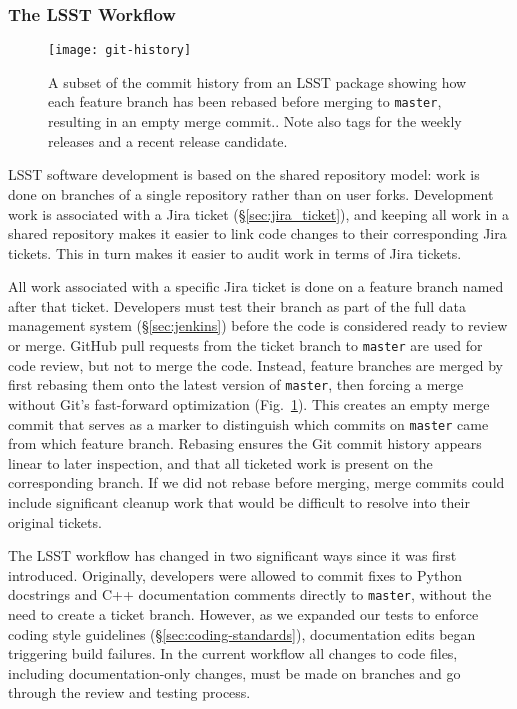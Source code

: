 \subsubsection{The LSST Workflow}\label{sec:dev_workflow}

\begin{figure}[t]
\begin{center}
  \texttt{[image: git-history]}
\end{center}
\caption{A subset of the commit history from an  LSST package showing how each feature branch has been rebased before merging to \texttt{master}, resulting in an empty merge commit..
Note also  tags for the weekly releases and a recent release candidate.
\label{fig:commitlog}
}
\end{figure}

LSST software development is based on the shared repository model: work is done on branches of a single repository rather than on user forks.
Development work is associated with a Jira ticket (\S\ref{sec:jira_ticket}), and keeping all work in a shared repository makes it easier to link code changes to their corresponding Jira tickets.
This in turn makes it easier to audit work in terms of Jira tickets.

All work associated with a specific Jira ticket is done on a feature branch named after that ticket.
Developers must test their branch as part of the full data management system (\S\ref{sec:jenkins}) before the code is considered ready to review or merge.
GitHub pull requests from the ticket branch to \texttt{master} are used for code review, but not to merge the code.
Instead, feature branches are merged by first rebasing them onto the latest version of \texttt{master}, then forcing a merge without Git's fast-forward optimization (Fig.~\ref{fig:commitlog}).
This creates an empty merge commit that serves as a marker to distinguish which commits on \texttt{master} came from which feature branch.
Rebasing ensures the Git commit history appears linear to later inspection, and that all ticketed work is present on the corresponding branch.
If we did not rebase before merging, merge commits could include significant cleanup work that would be difficult to resolve into their original tickets.

The LSST workflow has changed in two significant ways since it was first introduced.
Originally, developers were allowed to commit fixes to Python docstrings and C++ documentation comments directly to \texttt{master}, without the need to create a ticket branch.
However, as we expanded our tests to enforce coding style guidelines (\S\ref{sec:coding-standards}), documentation edits began triggering build failures.
In the current workflow all changes to code files, including documentation-only changes, must be made on branches and go through the review and testing process.

